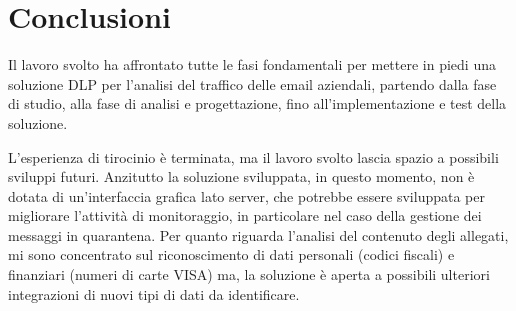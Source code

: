 \chapter{Conclusioni}

Il lavoro svolto ha affrontato tutte le fasi fondamentali per mettere in piedi una 
soluzione DLP per l'analisi del traffico delle email aziendali, partendo dalla fase di 
studio, alla fase di analisi e progettazione, fino all'implementazione e test della soluzione.

L'esperienza di tirocinio è terminata, ma il lavoro svolto lascia spazio a possibili sviluppi futuri.
Anzitutto la soluzione sviluppata, in questo momento, non è dotata di un'interfaccia grafica lato server,
che potrebbe essere sviluppata per migliorare l'attività di monitoraggio, in particolare nel caso della 
gestione dei messaggi in quarantena.
Per quanto riguarda l'analisi del contenuto degli allegati, mi sono concentrato sul riconoscimento di dati personali 
(codici fiscali) e finanziari (numeri di carte VISA) ma, la soluzione è aperta a possibili ulteriori integrazioni di nuovi
tipi di dati da identificare. 
